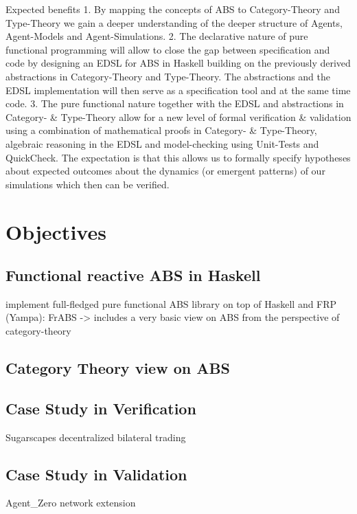 Expected benefits
1. By mapping the concepts of ABS to Category-Theory and Type-Theory we gain a deeper understanding of the deeper structure of Agents, Agent-Models and Agent-Simulations.
2. The declarative nature of pure functional programming will allow to close the gap between specification and code by designing an EDSL for ABS in Haskell building on the previously derived abstractions in Category-Theory and Type-Theory. The abstractions and the EDSL implementation will then serve as a specification tool and at the same time code.
3. The pure functional nature together with the EDSL and abstractions in Category- \& Type-Theory allow for a new level of formal verification \& validation using a combination of mathematical proofs in Category- \& Type-Theory, algebraic reasoning in the EDSL and model-checking using Unit-Tests and QuickCheck. The expectation is that this allows us to formally specify hypotheses about expected outcomes about the dynamics (or emergent patterns) of our simulations which then can be verified.
	
\section{Objectives}
\subsection{Functional reactive ABS in Haskell}
implement full-fledged pure functional ABS library on top of Haskell and FRP (Yampa): FrABS
	-> includes a very basic view on ABS from the perspective of category-theory
	
\subsection{Category Theory view on ABS}

\subsection{Case Study in Verification}
Sugarscapes decentralized  bilateral trading 

\subsection{Case Study in Validation}
Agent\_Zero network extension

